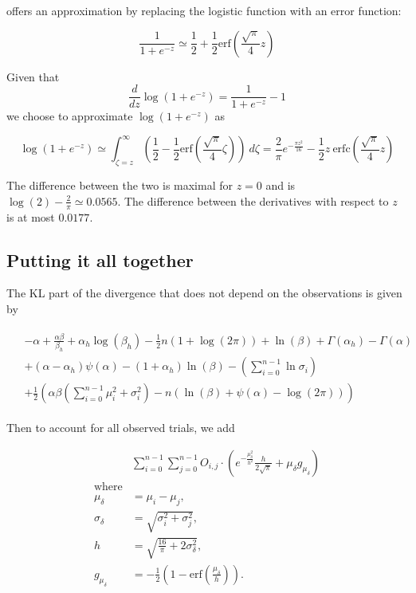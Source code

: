 \documentclass[12pt]{article}
\begin{document}
\cite{crooks2009logistic} offers an approximation by replacing the logistic function with an error function:

$$\frac{1}{1+e^{-z}} \simeq \frac{1}{2} + \frac{1}{2} \text{erf}\left(\frac{\sqrt{\pi}}{4} z\right)$$

Given that $$\frac{d}{d z}\log\left(1 + e^{-z}\right) = \frac{1}{1 + e^{-z}} - 1$$ we choose to approximate $\log\left(1 + e^{-z}\right)$
as

$$\log\left(1 + e^{-z}\right) \simeq \int_{\zeta=z}^{\infty} \left(\frac{1}{2} - \frac{1}{2} \text{erf}\left(\frac{\sqrt{\pi}}{4} \zeta \right)\right)~d\zeta =
\frac{2}{\pi}e^{-\frac{\pi z^2}{16}} - \frac{1}{2} z~\mathrm{erfc}\left(\frac{\sqrt{\pi}}{4} z\right)$$

The difference between the two is maximal for $z = 0$ and is $\log(2) - \frac{2}{\pi} \simeq 0.0565$. The difference between the derivatives with respect to $z$ is at most $0.0177$.

\subsection{Putting it all together}

The KL part of the divergence that does not depend on the observations is given by

\begin{align*}
    \begin{split}
    &-\alpha + \frac{\alpha\beta}{\beta_h} + \alpha_h \log(\beta_h) - \frac{1}{2} n (1 + \log(2 \pi)) + \ln(\beta) + \Gamma(\alpha_h) - \Gamma(\alpha)\\
    &+ (\alpha - \alpha_h) \psi(\alpha) - (1 + \alpha_h) \ln(\beta) - \left(\sum_{i=0}^{n-1} \ln\sigma_i\right)\\
    &+ \frac{1}{2} \left(\alpha\beta \left(\sum_{i=0}^{n-1} \mu_i^2 + \sigma_i^2\right) - n (\ln(\beta) + \psi(\alpha) - \log(2 \pi))\right)
    \end{split}
    \end{align*}


Then to account for all observed trials, we add

\begin{align*}
    &\sum_{i=0}^{n-1} \sum_{j=0}^{n-1} O_{i,j} \cdot \left( e^{-\frac{\mu_{\delta}^2}{h^2}} \frac{h}{2\sqrt{\pi}} + \mu_{\delta} g_{\mu_\delta} \right) \\
    \text{where} \\
    \mu_{\delta} &= \mu_i - \mu_j, \\
    \sigma_{\delta} &= \sqrt{\sigma_i^2 + \sigma_j^2}, \\
    h &= \sqrt{\frac{16}{\pi} + 2\sigma_{\delta}^2}, \\
    g_{\mu_\delta} &= -\frac{1}{2} \left( 1 - \text{erf}\left(\frac{\mu_{\delta}}{h}\right) \right).
\end{align*}
\end{document}
